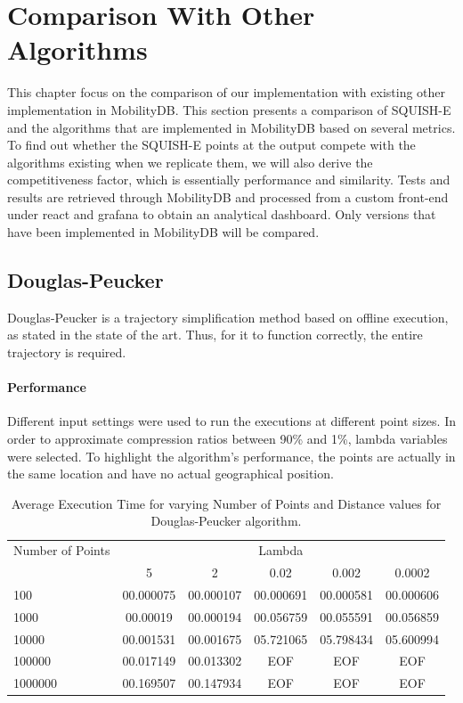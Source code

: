 

\section{Comparison With Other Algorithms}
This chapter focus on the comparison of our implementation with existing other implementation in MobilityDB.  This section presents a comparison of SQUISH-E and the algorithms that are implemented in MobilityDB based on several metrics. To find out whether the SQUISH-E points at the output compete with the algorithms existing when we replicate them, we will also derive the competitiveness factor, which is essentially performance and similarity. Tests and results are retrieved through MobilityDB and processed from a custom front-end under react and grafana to obtain an analytical dashboard. Only versions that have been implemented in MobilityDB will be compared.

\subsection{Douglas-Peucker}

Douglas-Peucker is a trajectory simplification method based on offline execution, as stated in the state of the art. Thus, for it to function correctly, the entire trajectory is required.

\paragraph{Performance}
Different input settings were used to run the executions at different point sizes. In order to approximate compression ratios between 90\% and 1\%, lambda variables were selected. To highlight the algorithm's performance, the points are actually in the same location and have no actual geographical position.

\begin{table}
    \centering
    \label{tab:execution_time_douglas}
    \begin{tabular}{@{}lccccc@{}}
        \toprule
        Number of Points & \multicolumn{5}{c}{Lambda} \\
        \cmidrule{2-6}
        & 5         & 2       & 0.02        & 0.002       & 0.0002       \\
        \midrule
        100              & 00.000075 & 00.000107 & 00.000691 & 00.000581 & 00.000606 \\
        1000             & 00.00019  & 00.000194 & 00.056759 & 00.055591 & 00.056859 \\
        10000            & 00.001531 & 00.001675 & 05.721065 & 05.798434 & 05.600994 \\
        100000           & 00.017149  & 00.013302  & EOF & EOF & EOF \\
        1000000          & 00.169507 & 00.147934 & EOF & EOF & EOF \\
        \bottomrule
    \end{tabular}
    \caption{Average Execution Time for varying Number of Points and Distance values for Douglas-Peucker algorithm.}
\end{table}

